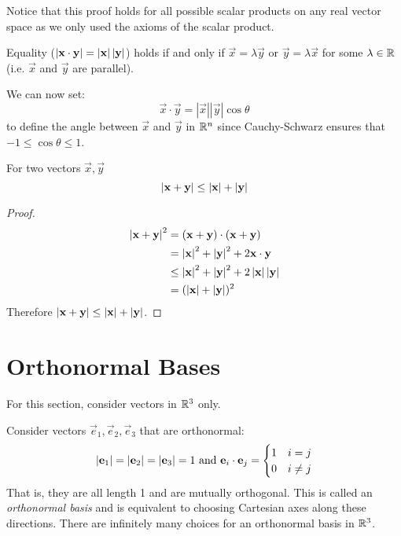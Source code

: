 \documentclass[../main.tex]{subfiles}
\begin{document}
Notice that this proof holds for all possible scalar products on any real vector space as we only used the axioms of the scalar product.
\begin{remark}
  Equality ($\abs{\vec{x} \cdot \vec{y}} = \abs{\vec{x}}\abs{\vec{y}}$) holds if and only if $\vec{x} = \lambda \vec{y}$ or $\vec{y} = \lambda \vec{x}$ for some $\lambda \in \R$ (i.e. $\vec{x}$ and $\vec{y}$ are parallel).
\end{remark}
We can now set:
\[
  \vec{x} \cdot \vec{y} = |\vec{x}||\vec{y}|\cos\theta
\]
to define the angle between $\vec{x}$ and $\vec{y}$ in $\R^{n}$ since Cauchy-Schwarz ensures that $-1 \leq \cos \theta \leq 1$.
\begin{corollary}
  For two vectors $\vec{x}, \vec{y}$
  \[
    \abs{\vec{x} + \vec{y}} \leq \abs{\vec{x}} + \abs{\vec{y}}
  \]
\end{corollary}
\begin{proof}
  \begin{align*}
    \abs{\vec{x} + \vec{y}}^2 &= (\vec{x} + \vec{y}) \cdot (\vec{x} + \vec{y}) \\
                              &= \abs{\vec{x}}^2 + \abs{\vec{y}}^2 + 2 \vec{x} \cdot \vec{y} \\
                              &\leq \abs{\vec{x}}^2 + \abs{\vec{y}}^2 + 2 \abs{\vec{x}}\abs{\vec{y}} \\
                              &= (\abs{\vec{x}} + \abs{\vec{y}})^2
  \end{align*}
  Therefore $\abs{\vec{x} + \vec{y}} \leq \abs{\vec{x}} + \abs{\vec{y}}$.
\end{proof}

\section{Orthonormal Bases}
\label{orthonormalBasis}
\begin{remark}[Note]
For this section, consider vectors in $\R^{3}$ only.
\end{remark}
Consider vectors $\vec{e}_1, \vec{e}_2, \vec{e}_3$ that are orthonormal:
\[
  \abs{\vec{e}_1} = \abs{\vec{e}_2} = \abs{\vec{e}_3} = 1 \text{ and } \vec{e}_i \cdot \vec{e}_j = \begin{cases}
  1 & i=j \\
  0 & i\neq j
  \end{cases}
\]
That is, they are all length 1 and are mutually orthogonal.
This is called an \textit{orthonormal basis} and is equivalent to choosing Cartesian axes along these directions.
There are infinitely many choices for an orthonormal basis in $\R^{3}$.
\end{document}
